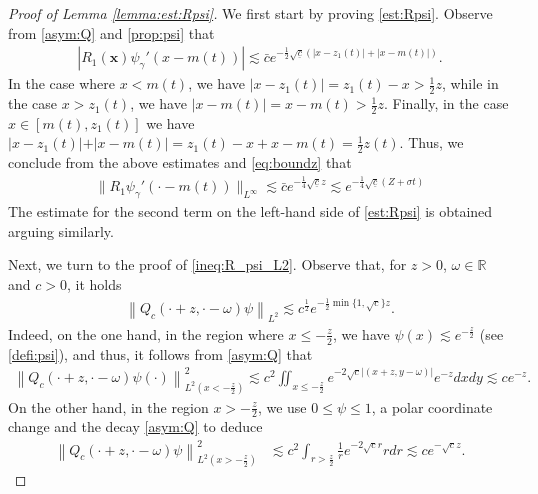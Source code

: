 \documentclass[reqno,10pt]{amsart}
\numberwithin{equation}{section}
\newcommand{\bx}{\mathbf{x}}
\begin{document}
\begin{proof}[Proof of Lemma \ref{lemma:est:Rpsi}]
    We first start by proving \eqref{est:Rpsi}. Observe from \eqref{asym:Q} and \eqref{prop:psi} that
			\begin{align*} 
				\left| R_1(\bx) \psi_\gamma'\left( x - m(t)\right) \right| %
            \lesssim \bar{c} e^{-\frac12\sqrt{\underline{c}}\left(\left| x-z_1(t)\right|+\left| x-m(t)\right| \right)}.
			\end{align*}
   In the case where $x<m(t)$, we have $\vert x-z_1(t) \vert=z_1(t)-x>\frac12 z$, while in the case $x>z_1(t)$, we have $\vert x-m(t) \vert=x-m(t)>\frac12 z$. Finally, in the case $x \in [m(t),z_1(t)]$ we have $ \vert x-z_1(t) \vert + \vert x- m(t) \vert = z_1(t)-x +x- m(t) = \frac12 z(t)$. Thus, we conclude from the above estimates and \eqref{eq:boundz} that 
            \begin{align*}
				\| R_1 \psi_\gamma'\left( \cdot - m(t)\right) \|_{L^\infty}  \lesssim \bar{c} e^{-\frac14 \sqrt{\underline{c}} z} \lesssim e^{-\frac14 \sqrt{\underline{c}} \left(Z+\sigma t\right)}
			\end{align*}
			The estimate for the second term on the left-hand side of \eqref{est:Rpsi} is obtained arguing similarly. 

   Next, we turn to the proof of \eqref{ineq:R_psi_L2}. Observe that, for $z>0$, $\omega\in \mathbb{R}$ and $c>0$, it holds
			\begin{align}\label{ineq:Qc_psi}
				\left\| Q_c \left( \cdot + z, \cdot - \omega \right) \psi \right\|_{L^2} \lesssim c^{\frac12} e^{ - \frac12\min\{1,\sqrt{c}\} z}.
			\end{align}
			Indeed, on the one hand, in the region where $x\leq -\frac{z}{2}$, we have $\psi(x) \lesssim e^{- \frac{z}{2}}$ (see \eqref{defi:psi}), and thus, it follows from \eqref{asym:Q} that
			\begin{align*}
				\left\| Q_c \left( \cdot +z, \cdot - \omega \right) \psi(\cdot) \right\|_{L^2(x<-\frac{z}2)}^2  \lesssim c^2 \iint_{x \leq -\frac{z}{2}} e^{- 2 \sqrt{c} \left\vert (x+z,y-\omega) \right\vert } e^{-z} dx dy \lesssim c e^{-z}. 
			\end{align*}
			On the other hand, in the region $x>-\frac{z}{2}$, we use $0\le \psi \le 1$, a polar coordinate change and the decay \eqref{asym:Q} to deduce
			\begin{align*}
				\left\| Q_c \left( \cdot + z, \cdot - \omega \right) \psi \right\|_{L^2(x > - \frac{z}{2})}^2 
				& \lesssim c^2 \int_{r>\frac{z}{2}} \frac{1}{r} e^{- 2 \sqrt{c}r} r dr \lesssim c e^{-\sqrt{c}z}.
			\end{align*}
   

\end{proof}
\end{document}
